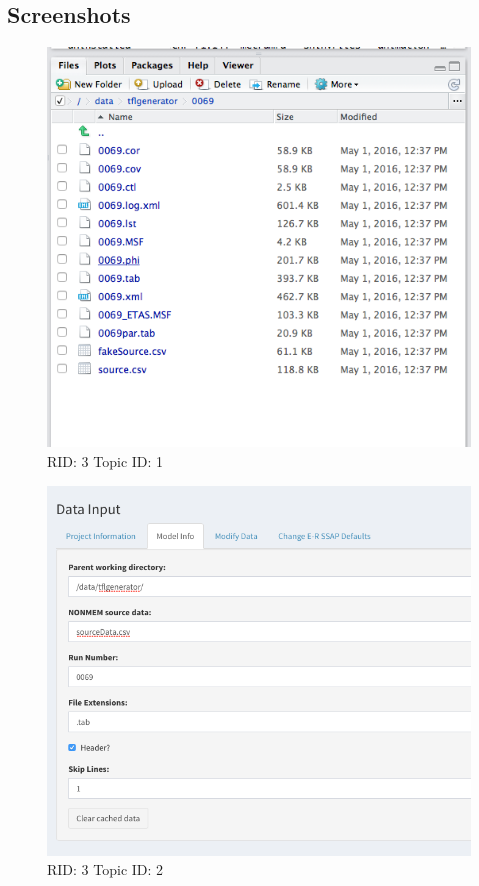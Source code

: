 \documentclass{article}
\begin{document}
\subsection*{Screenshots}

\begin{figure}[hp]
\includegraphics[width=.8\textwidth]{screencaps/3-1-1.png}
\caption{RID: 3 Topic ID: 1}
\end{figure}

\begin{figure}[hp]
\includegraphics[width=.8\textwidth]{screencaps/3-2-1.png}
\caption{RID: 3 Topic ID: 2}
\end{figure}
\end{document}
